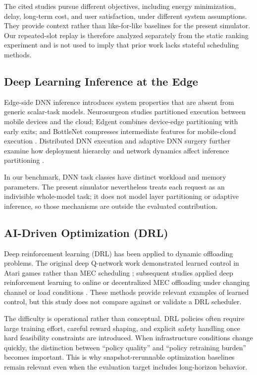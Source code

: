 \documentclass[pdflatex,sn-mathphys-num]{sn-jnl}
\begin{document}
The cited studies pursue different objectives, including energy minimization, delay, long-term cost, and user satisfaction, under different system assumptions. They provide context rather than like-for-like baselines for the present simulator. Our repeated-slot replay is therefore analyzed separately from the static ranking experiment and is not used to imply that prior work lacks stateful scheduling methods.

\subsection{Deep Learning Inference at the Edge}
Edge-side DNN inference introduces system properties that are absent from generic scalar-task models. Neurosurgeon studies partitioned execution between mobile devices and the cloud; Edgent combines device-edge partitioning with early exits; and BottleNet compresses intermediate features for mobile-cloud execution \cite{Kang2017, Li2018, Eshratifar2019}. Distributed DNN execution and adaptive DNN surgery further examine how deployment hierarchy and network dynamics affect inference partitioning \cite{Teerapittayanon2017, Hu2019DNNsurgery}.

In our benchmark, DNN task classes have distinct workload and memory parameters. The present simulator nevertheless treats each request as an indivisible whole-model task; it does not model layer partitioning or adaptive inference, so those mechanisms are outside the evaluated contribution.

\subsection{AI-Driven Optimization (DRL)}
Deep reinforcement learning (DRL) has been applied to dynamic offloading problems. The original deep Q-network work demonstrated learned control in Atari games rather than MEC scheduling \cite{Mnih2015}; subsequent studies applied deep reinforcement learning to online or decentralized MEC offloading under changing channel or load conditions \cite{Huang2020, Tang2022}. These methods provide relevant examples of learned control, but this study does not compare against or validate a DRL scheduler.

The difficulty is operational rather than conceptual. DRL policies often require large training effort, careful reward shaping, and explicit safety handling once hard feasibility constraints are introduced. When infrastructure conditions change quickly, the distinction between ``policy quality'' and ``policy retraining burden'' becomes important. This is why snapshot-rerunnable optimization baselines remain relevant even when the evaluation target includes long-horizon behavior.
\end{document}

